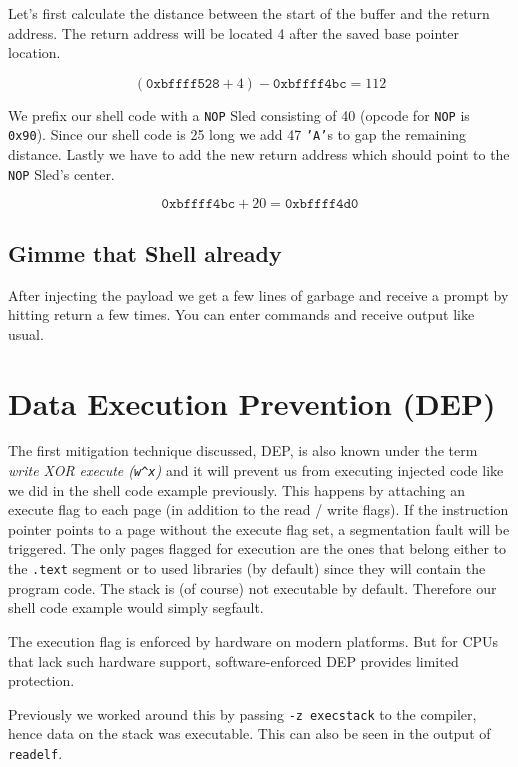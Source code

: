 \documentclass[article]{uibk}
\begin{document}
Let's first calculate the distance between the start of the buffer and the
return address. The return address will be located \SI{4}{\byte} after the
saved base pointer location.

\[(\texttt{0xbffff528} + 4) - \texttt{0xbffff4bc} = 112\]

We prefix our shell code with a \texttt{NOP} Sled consisting of \SI{40}{\byte}
(opcode for \texttt{NOP} is \texttt{0x90}). Since our shell code is \SI{25}{\byte}
long we add 47 \texttt{'A'}s to gap the remaining distance. Lastly we have to add
the new return address which should point to the \texttt{NOP} Sled's center.

\[\texttt{0xbffff4bc} + 20 = \texttt{0xbffff4d0}\]

\subsection{Gimme that Shell already}


After injecting the payload we get a few lines of garbage and receive a prompt
by hitting return a few times. You can enter commands and receive output like
usual.

\section{Data Execution Prevention (DEP)}

The first mitigation technique discussed, DEP, is also known under the term
\textit{write XOR execute (\texttt{w\^{}x})} and it will prevent us from
executing injected code like we did in the shell code example previously. This
happens by attaching an execute flag to each page (in addition to the read /
write flags). If the instruction pointer points to a page without the execute
flag set, a segmentation fault will be triggered. The only pages flagged for
execution are the ones that belong either to the \texttt{.text} segment or to
used libraries (by default) since they will contain the program code. The stack
is (of course) not executable by default. Therefore our shell code example
would simply segfault.

The execution flag is enforced by hardware on modern platforms. But for CPUs
that lack such hardware support, software-enforced DEP provides limited
protection.~\cite{wiki:dep}

Previously we worked around this by passing \texttt{-z execstack} to the
compiler, hence data on the stack was executable. This can also be seen in the
output of \texttt{readelf}.
\end{document}
